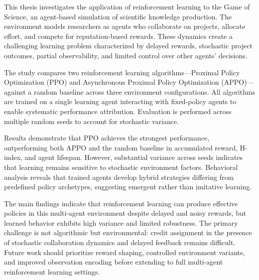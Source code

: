 \documentclass[english,bachelor]{hsluthesis}
\begin{document}
\begin{abstractstyle}{\hsummary}
    This thesis investigates the application of reinforcement learning to the Game of Science, an agent-based simulation of scientific knowledge production. The environment models researchers as agents who collaborate on projects, allocate effort, and compete for reputation-based rewards. These dynamics create a challenging learning problem characterized by delayed rewards, stochastic project outcomes, partial observability, and limited control over other agents' decisions.

    The study compares two reinforcement learning algorithms—Proximal Policy Optimization (PPO) and Asynchronous Proximal Policy Optimization (APPO)—against a random baseline across three environment configurations. All algorithms are trained on a single learning agent interacting with fixed-policy agents to enable systematic performance attribution. Evaluation is performed across multiple random seeds to account for stochastic variance.

    Results demonstrate that PPO achieves the strongest performance, outperforming both APPO and the random baseline in accumulated reward, H-index, and agent lifespan. However, substantial variance across seeds indicates that learning remains sensitive to stochastic environment factors. Behavioral analysis reveals that trained agents develop hybrid strategies differing from predefined policy archetypes, suggesting emergent rather than imitative learning.

    The main findings indicate that reinforcement learning can produce effective policies in this multi-agent environment despite delayed and noisy rewards, but learned behavior exhibits high variance and limited robustness. The primary challenge is not algorithmic but environmental: credit assignment in the presence of stochastic collaboration dynamics and delayed feedback remains difficult. Future work should prioritize reward shaping, controlled environment variants, and improved observation encoding before extending to full multi-agent reinforcement learning settings.
\end{abstractstyle}

\tableofcontents
\listoffigures
\listoftables
\printnoidxglossaries
\end{document}
